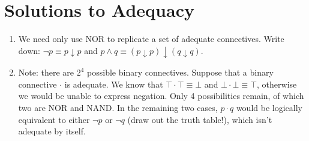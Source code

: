 \documentclass[10pt,a4paper]{article}
\begin{document}
\section{Solutions to Adequacy}

\begin{enumerate}
    \item We need only use NOR to replicate a set of adequate connectives.
    Write down: \( \neg p \equiv p \downarrow p \) and 
    \( p \land q \equiv ( p \downarrow p ) \downarrow ( q \downarrow q) \).
    \item Note: there are \(2^4\) possible binary connectives.
    Suppose that a binary connective \( \cdot \) is adequate. We know that 
    \( \top \cdot \top \equiv \bot \) and \( \bot \cdot \bot \equiv \top \), 
    otherwise we would be unable to express negation.
    Only 4 possibilities remain, of which two are NOR and NAND.
    In the remaining two cases, \( p \cdot q \) would be logically equivalent 
    to either \( \neg p \) or \( \neg q \) (draw out the truth table!), 
    which isn't adequate by itself.
\end{enumerate}
\end{document}
